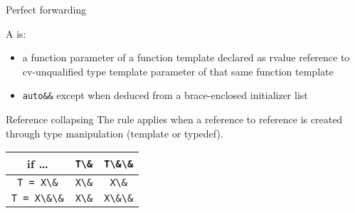\begin{frame}{Perfect forwarding}{}
  \begin{definition}
    A  is:
    \begin{itemize}
    \item
      a function parameter of a function template declared as rvalue reference to cv-unqualified type template parameter of that same function template
    \item
      \lstinline!auto&&! except when deduced from a brace-enclosed initializer list
    \end{itemize}
  \end{definition}
  \begin{block}{Reference collapsing}
    The  rule applies when a reference to reference is created through type manipulation (template or typedef).

    \begin{center}
      \begin{tabular}{|c||c|c|}
      \hline
        if \ldots          & \lstinline!T\&! & \lstinline!T\&\&!  \\
      \hline
      \hline
      \lstinline!T = X\&!  & \lstinline!X\&! & \lstinline!X\&!   \\
      \hline
      \lstinline!T = X\&\&!  & \lstinline!X\&! & \lstinline!X\&\&!  \\
      \hline
      \end{tabular}
    \end{center}
  \end{block}
\end{frame}

